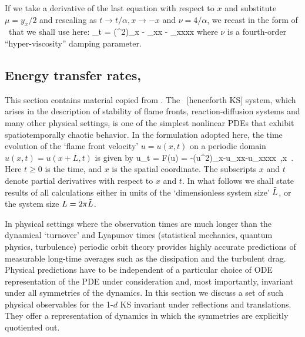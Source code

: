 If we take a derivative of the last equation with respect to $x$ and
substitute $\mu = y_x/2$ and rescaling as $t \to t/\alpha, x \to -x$ and
$\nu = 4/\alpha$, we recast  in the form of \KSe\
that we shall use here:
\beq
\mu_t = (\mu^2)_x - \mu_{xx} - \nu\mu_{xxxx}
\eeq
where $\nu$ is a fourth-order ``hyper-viscosity'' damping parameter.


\subsection{Energy transfer rates, \KS}
\label{sec:energy}

This section contains material copied from .
The \KS\ [henceforth KS] system,
which arises in the description of
stability of flame fronts, reaction-diffusion systems and many other
physical settings\rf{KNSks90}, is one of the simplest nonlinear PDEs that
exhibit spatiotemporally chaotic behavior. In the formulation
adopted here, the time evolution of the `flame front velocity'
$u=u(x,t)$ on a periodic domain $u(x,t) = u(x+L,t)$ is given by
\beq
  u_t = F(u) = -{\textstyle{}}(u^2)_x-u_{xx}-u_{xxxx}
    \,,\qquad   x \in [-L/2,L/2]
    \,.
Here $t \geq 0$ is the time, and $x$ is the spatial coordinate.
The subscripts $x$ and $t$ denote partial derivatives with respect to
$x$ and $t$. In what follows
we shall state results of all calculations either in units of the
`dimensionless system size' $\tilde{L}$, or the system size $L = 2 \pi
\tilde{L}$.

In physical settings where the observation times are much
longer than the dynamical `turnover' and Lyapunov times
(statistical mechanics, quantum physics, turbulence) periodic
orbit theory provides highly accurate predictions
of measurable long-time averages such as the dissipation and
the turbulent drag. Physical predictions have to
be independent of a particular choice of ODE representation
of the PDE under consideration and, most importantly,
invariant under all symmetries of the dynamics. In this
section we discuss a set of such physical observables for the
1-$d$ KS invariant under reflections and translations. They
offer a representation of dynamics in which the symmetries
are explicitly quotiented out.

